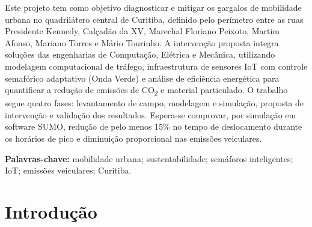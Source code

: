 \documentclass[12pt,a4paper,oneside]{abntex2}
\begin{document}

\imprimircapa

\imprimirfolhaderosto



\begin{resumoumacoluna}
Este projeto tem como objetivo diagnosticar e mitigar os gargalos de mobilidade urbana no quadrilátero central de Curitiba, definido pelo perímetro entre as ruas Presidente Kennedy, Calçadão da XV, Marechal Floriano Peixoto, Martim Afonso, Mariano Torres e Mário Tourinho. A intervenção proposta integra soluções das engenharias de Computação, Elétrica e Mecânica, utilizando modelagem computacional de tráfego, infraestrutura de sensores IoT com controle semafórico adaptativo (Onda Verde) e análise de eficiência energética para quantificar a redução de emissões de CO\textsubscript{2} e material particulado. O trabalho segue quatro fases: levantamento de campo, modelagem e simulação, proposta de intervenção e validação dos resultados. Espera-se comprovar, por simulação em software SUMO, redução de pelo menos 15\% no tempo de deslocamento durante os horários de pico e diminuição proporcional nas emissões veiculares.

\textbf{Palavras-chave:} mobilidade urbana; sustentabilidade; semáforos inteligentes; IoT; emissões veiculares; Curitiba.
\end{resumoumacoluna}

\listoffigures*
\cleardoublepage

\listoftables*
\cleardoublepage

\tableofcontents*
\cleardoublepage


\chapter{Introdução}
\end{document}
